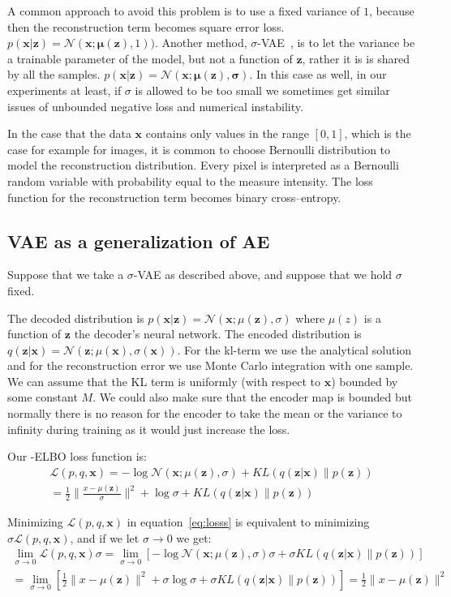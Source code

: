 \documentclass[11pt, a4paper]{report}
\theoremstyle{plain}
\theoremstyle{definition}
\theoremstyle{remark}
\newcommand{\x}{\mathbf{x}}
\newcommand{\z}{\mathbf{z}}
\newcommand{\LL}{\mathcal{L}}
\newcommand{\NN}{\mathcal{N}}
\newcommand{\bv}[1]{\boldsymbol{#1}}
\begin{document}
A common approach to avoid this problem is to use a fixed variance of $1$, because then the
reconstruction term becomes square error loss.
$p(\x | \z) = \NN(\x ; \bv{\mu}(\z), 1))$.
Another method, $\sigma$-VAE~\cite{rybkin2021simple}, is to let the variance
be a trainable parameter of the model, but not a function of $\z$, rather it is
is shared by all the samples.
$p(\x | \z) = \NN(\x ; \bv{\mu}(\z), \bv{\sigma})$.
In this case as well, in our experiments at least, if $\sigma$ is allowed to be
too small we sometimes get similar issues of unbounded negative loss and
numerical instability. 

In the case that the data $\x$ contains only values in the range $[0,1]$, which
is the case for example for images, it is common to choose Bernoulli
distribution to model the reconstruction distribution.
Every pixel is interpreted as a Bernoulli random variable with probability equal
to the measure intensity. The loss function for the reconstruction term becomes
binary cross--entropy.

\subsection{VAE as a generalization of AE}
Suppose that we take a $\sigma$-VAE as described above, and suppose that we hold
$\sigma$ fixed.

The decoded distribution is $p(\x | \z) = \NN(\x ; \mu(\z), \sigma)$ where $\mu(z)$ is a
function of $\z$ the decoder's neural network. The encoded distribution is $q(\z | \x) = \NN(\z
; \mu(\x), \sigma(\x))$. For the kl-term we use the analytical solution and for
the reconstruction error we use Monte Carlo integration with one sample. We can
assume that the KL term is uniformly (with respect to $\x$) bounded by some
constant $M$. We could also make sure that the encoder map is bounded but
normally there is no reason for the encoder to take the mean or the variance to
infinity during training as it would just increase the loss.

Our -ELBO loss function is:
\begin{equation}
\begin{aligned}
\LL(p,q, \x) = -\log \NN(\x; \mu(\z), \sigma) + KL(q(\z | \x) \| p(\z)) \\
= \frac{1}{2}\|\frac{x - \mu(\z)}{\sigma}\|^2 + \log \sigma + KL(q(\z | \x) \| p(\z))
\end{aligned}
\label{eq:losss}
\end{equation}

Minimizing $\LL(p,q,\x)$ in equation~\ref{eq:losss} is equivalent to minimizing 
$\sigma \LL(p,q,\x)$, and if we let $\sigma \to 0$ we get:
\begin{equation}
\begin{aligned}
\lim_{\sigma \rightarrow 0} \LL(p,q, \x) \sigma 
= \lim_{\sigma \to 0}[ -\log \NN(\x; \mu(\z), \sigma) \sigma + \sigma KL(q(\z |
\x) \| p(\z))] \\
= \lim_{\sigma \to 0} [\frac{1}{2}\|x - \mu(\z)\|^2 + \sigma \log \sigma  +
\sigma KL(q(\z | \x) \| p(\z))] = 
\frac{1}{2}\|x - \mu(\z)\|^2
\end{aligned}
\label{eq:lossss}
\end{equation}
\end{document}
